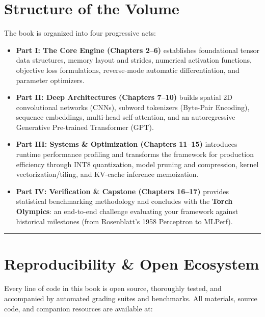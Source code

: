 \documentclass[
  letterpaper,
]{scrbook}
\providecommand{\tightlist}{%
  \setlength{\itemsep}{0pt}\setlength{\parskip}{0pt}}
\begin{document}
\section*{Structure of the Volume}\label{structure-of-the-volume}


The book is organized into four progressive acts:

\begin{itemize}
\tightlist
\item
  \textbf{Part I: The Core Engine (Chapters 2--6)} establishes
  foundational tensor data structures, memory layout and strides,
  numerical activation functions, objective loss formulations,
  reverse-mode automatic differentiation, and parameter optimizers.
\item
  \textbf{Part II: Deep Architectures (Chapters 7--10)} builds spatial
  2D convolutional networks (CNNs), subword tokenizers (Byte-Pair
  Encoding), sequence embeddings, multi-head self-attention, and an
  autoregressive Generative Pre-trained Transformer (GPT).
\item
  \textbf{Part III: Systems \& Optimization (Chapters 11--15)}
  introduces runtime performance profiling and transforms the framework
  for production efficiency through INT8 quantization, model pruning and
  compression, kernel vectorization/tiling, and KV-cache inference
  memoization.
\item
  \textbf{Part IV: Verification \& Capstone (Chapters 16--17)} provides
  statistical benchmarking methodology and concludes with the
  \textbf{Torch Olympics}: an end-to-end challenge evaluating your
  framework against historical milestones (from Rosenblatt's 1958
  Perceptron to MLPerf).
\end{itemize}

\begin{center}\rule{0.5\linewidth}{0.5pt}\end{center}

\section*{Reproducibility \& Open
Ecosystem}\label{reproducibility-open-ecosystem}


Every line of code in this book is open source, thoroughly tested, and
accompanied by automated grading suites and benchmarks. All materials,
source code, and companion resources are available at:
\end{document}
